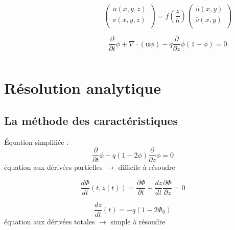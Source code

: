 \documentclass[xcolor=dvipsnames]{beamer}
\newcommand{\p}[2]{\ensuremath{\frac{\partial {#1}}{\partial {#2}}}}
\newcommand{\tot}[2]{\ensuremath{\frac{d {#1}}{d {#2}}}}
\begin{document}
\begin{frame}
\begin{columns}
\begin{column}{6cm}
\end{column}

\begin{column}{6cm}

\only<1-2>{
\[
	h\bar{u_i}(x,y) = \int_{0}^{h} u_i(x, y, z) dz
\]

\[
	\p{}{x} h \bar u + \p{}{y} h \bar v = 0
\]

\[
	\p{z}{x_i} = \epsilon_{ij} h \bar u_j 
\]
}

{

\[
		\begin{pmatrix}
	u(x, y, z)\\
	v(x, y, z)\\
\end{pmatrix}
=
f \left( \frac{z}{h} \right)
\begin{pmatrix}
	\bar u(x, y) \\
	\bar v(x, y) \\
\end{pmatrix}
\]

\[
	\p{}{t} \phi + \nabla \cdot ( \mathbf{u} \phi )  - q \p{}{z} \phi( 1 - \phi) = 0
\]

}

\end{column}

\end{columns}

\end{frame}


\section{Résolution analytique}
\subsection{La méthode des caractéristiques}
\begin{frame}

Équation simplifiée :
\[
		\p{}{t} \phi - q(1 - 2 \phi) \p{}{z} \phi = 0
\]
équation aux dérivées partielles $\rightarrow$ difficile à résoudre

\[
	\frac{d \Phi}{d t} (t, z(t)) = \p{\Phi}{t} + 
	\tot{z}{t}\p{\Phi}{z} = 0
\]

\[
		\tot{z}{t}(t) = - q  \left( 1-2\Phi_0 \right)
\]
équation aux dérivées totales $\rightarrow$ simple à résoudre
\end{frame}
\end{document}
